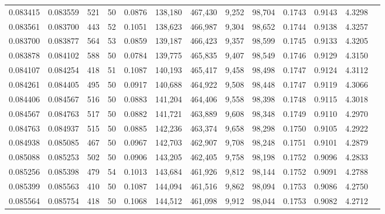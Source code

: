 \begin{tabular}{rrrrrrrrrrrrr}
0.083415 & 0.083559 &   521 &  50 &                                     0.0876 & 138,180 & 467,430 &   9,252 &  98,704 & 0.1743 & 0.9143 & 4.3298 \\
0.083561 & 0.083700 &   443 &  52 &                                     0.1051 & 138,623 & 466,987 &   9,304 &  98,652 & 0.1744 & 0.9138 & 4.3257 \\
0.083700 & 0.083877 &   564 &  53 &                                     0.0859 & 139,187 & 466,423 &   9,357 &  98,599 & 0.1745 & 0.9133 & 4.3205 \\
0.083878 & 0.084102 &   588 &  50 &                                     0.0784 & 139,775 & 465,835 &   9,407 &  98,549 & 0.1746 & 0.9129 & 4.3150 \\
0.084107 & 0.084254 &   418 &  51 &                                     0.1087 & 140,193 & 465,417 &   9,458 &  98,498 & 0.1747 & 0.9124 & 4.3112 \\
0.084261 & 0.084405 &   495 &  50 &                                     0.0917 & 140,688 & 464,922 &   9,508 &  98,448 & 0.1747 & 0.9119 & 4.3066 \\
0.084406 & 0.084567 &   516 &  50 &                                     0.0883 & 141,204 & 464,406 &   9,558 &  98,398 & 0.1748 & 0.9115 & 4.3018 \\
0.084567 & 0.084763 &   517 &  50 &                                     0.0882 & 141,721 & 463,889 &   9,608 &  98,348 & 0.1749 & 0.9110 & 4.2970 \\
0.084763 & 0.084937 &   515 &  50 &                                     0.0885 & 142,236 & 463,374 &   9,658 &  98,298 & 0.1750 & 0.9105 & 4.2922 \\
0.084938 & 0.085085 &   467 &  50 &                                     0.0967 & 142,703 & 462,907 &   9,708 &  98,248 & 0.1751 & 0.9101 & 4.2879 \\
0.085088 & 0.085253 &   502 &  50 &                                     0.0906 & 143,205 & 462,405 &   9,758 &  98,198 & 0.1752 & 0.9096 & 4.2833 \\
0.085256 & 0.085398 &   479 &  54 &                                     0.1013 & 143,684 & 461,926 &   9,812 &  98,144 & 0.1752 & 0.9091 & 4.2788 \\
0.085399 & 0.085563 &   410 &  50 &                                     0.1087 & 144,094 & 461,516 &   9,862 &  98,094 & 0.1753 & 0.9086 & 4.2750 \\
0.085564 & 0.085754 &   418 &  50 &                                     0.1068 & 144,512 & 461,098 &   9,912 &  98,044 & 0.1753 & 0.9082 & 4.2712 \\

\end{tabular}
